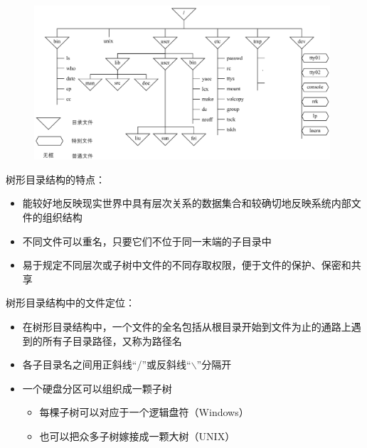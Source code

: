 \documentclass[cs4size,a4paper,10pt]{ctexart}
\begin{document}
	\begin{figure}[H]
		\centering
		\includegraphics[width=0.98\textwidth]{img/5.3.1.3.1}
	\end{figure}

	树形目录结构的特点：
	\begin{itemize}
		\item 能较好地反映现实世界中具有层次关系的数据集合和较确切地反映系统内部文件的组织结构
		\item 不同文件可以重名，只要它们不位于同一末端的子目录中
		\item 易于规定不同层次或子树中文件的不同存取权限，便于文件的保护、保密和共享
	\end{itemize}

	树形目录结构中的文件定位：
	\begin{itemize}
		\item 在树形目录结构中，一个文件的全名包括从根目录开始到文件为止的通路上遇到的所有子目录路径，又称为路径名
		\item 各子目录名之间用正斜线“/”或反斜线“$\backslash$”分隔开
		\item 一个硬盘分区可以组织成一颗子树
		\begin{itemize}
			\item 每棵子树可以对应于一个逻辑盘符（Windows）
			\item 也可以把众多子树嫁接成一颗大树（UNIX）
		\end{itemize}
	\end{itemize}
\end{document}
